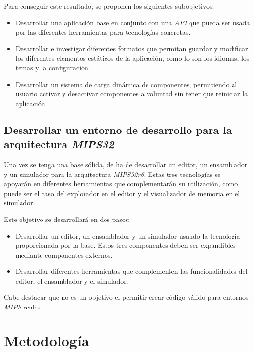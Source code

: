 \noindent Para conseguir este resultado, se proponen los siguientes subobjetivos:
\begin{itemize}
    \item Desarrollar una aplicación base en conjunto con una \textit{API} que pueda
    ser usada por las diferentes herramientas para tecnologías concretas.
    \item Desarrollar e investigar diferentes formatos que permitan guardar
    y modificar los diferentes elementos estáticos de la aplicación, como lo son
    los idiomas, los temas y la configuración.
    \item Desarrollar un sistema de carga dinámica de componentes, permitiendo
    al usuario activar y desactivar componentes a voluntad sin tener que
    reiniciar la aplicación.
\end{itemize}

\subsection{Desarrollar un entorno de desarrollo para la arquitectura \textit{MIPS32}}
\label{subsec:desarrollar-un-entorno-de-desarrollo-para-la-arquitectura-mips32}

Una vez se tenga una base sólida, de ha de desarrollar un editor, un ensamblador
y un simulador para la arquitectura \textit{MIPS32r6}.
Estas tres tecnologías se apoyarán en diferentes herramientas que complementarán
su utilización, como puede ser el caso del explorador en el editor y el visualizador
de memoria en el simulador.

\noindent Este objetivo se desarrollará en dos pasos:

\begin{itemize}
    \item Desarrollar un editor, un ensamblador y un simulador usando la tecnología
    proporcionada por la base.
    Estos tres componentes deben ser expandibles mediante componentes externos.
    \item Desarrollar diferentes herramientas que complementen las funcionalidades
    del editor, el ensamblador y el simulador.
\end{itemize}

\noindent Cabe destacar que no es un objetivo el permitir crear código válido para
entornos \textit{MIPS} reales.

\section{Metodología}\label{sec:metodologia}

